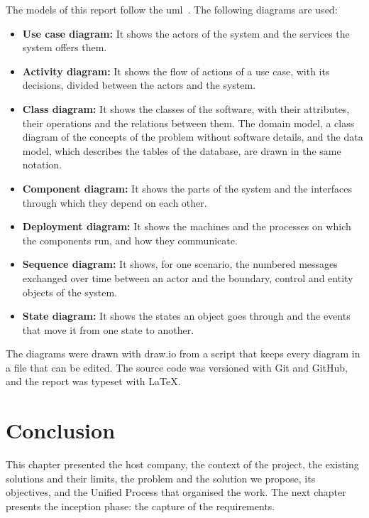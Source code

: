 The models of this report follow the \gls{uml}~\cite{omg2017uml}. The following diagrams are used:

\begin{itemize}
    \item \textbf{Use case diagram:} It shows the actors of the system and the services the system offers them.
    \item \textbf{Activity diagram:} It shows the flow of actions of a use case, with its decisions, divided between the actors and the system.
    \item \textbf{Class diagram:} It shows the classes of the software, with their attributes, their operations and the relations between them. The domain model, a class diagram of the concepts of the problem without software details, and the data model, which describes the tables of the database, are drawn in the same notation.
    \item \textbf{Component diagram:} It shows the parts of the system and the interfaces through which they depend on each other.
    \item \textbf{Deployment diagram:} It shows the machines and the processes on which the components run, and how they communicate.
    \item \textbf{Sequence diagram:} It shows, for one scenario, the numbered messages exchanged over time between an actor and the boundary, control and entity objects of the system.
    \item \textbf{State diagram:} It shows the states an object goes through and the events that move it from one state to another.
\end{itemize}

The diagrams were drawn with draw.io from a script that keeps every diagram in a file that can be edited. The source code was versioned with Git and GitHub, and the report was typeset with \LaTeX.

\section*{Conclusion}

This chapter presented the host company, the context of the project, the existing solutions and their limits, the problem and the solution we propose, its objectives, and the Unified Process that organised the work. The next chapter presents the inception phase: the capture of the requirements.
